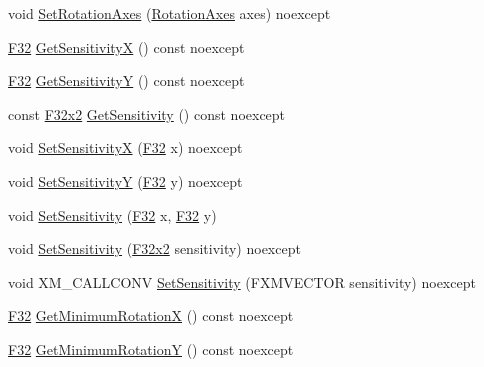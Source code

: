 \begin{DoxyCompactItemize}
void \hyperlink{classmage_1_1script_1_1_mouse_look_script_a82697e11738554a44b4a749227e231ee}{Set\+Rotation\+Axes} (\hyperlink{classmage_1_1script_1_1_mouse_look_script_a662018db64c5dc84a958eb1c6123a829}{Rotation\+Axes} axes) noexcept
\item 
\hyperlink{namespacemage_aa97e833b45f06d60a0a9c4fc22ae02c0}{F32} \hyperlink{classmage_1_1script_1_1_mouse_look_script_a86ee9593f0221bfa259f5ae5dd6edb30}{Get\+SensitivityX} () const noexcept
\item 
\hyperlink{namespacemage_aa97e833b45f06d60a0a9c4fc22ae02c0}{F32} \hyperlink{classmage_1_1script_1_1_mouse_look_script_a39303e2d535ecc610ac4ea2f23825452}{Get\+SensitivityY} () const noexcept
\item 
const \hyperlink{namespacemage_aa87237ad091f5cd7da612b8523fc108f}{F32x2} \hyperlink{classmage_1_1script_1_1_mouse_look_script_aba0ebcfb2085d74ee7d6b388d4b0b239}{Get\+Sensitivity} () const noexcept
\item 
void \hyperlink{classmage_1_1script_1_1_mouse_look_script_a97c2564df1660fb9d07f9a4269a77568}{Set\+SensitivityX} (\hyperlink{namespacemage_aa97e833b45f06d60a0a9c4fc22ae02c0}{F32} x) noexcept
\item 
void \hyperlink{classmage_1_1script_1_1_mouse_look_script_a95376c27d55cf12d557427b68ccbd802}{Set\+SensitivityY} (\hyperlink{namespacemage_aa97e833b45f06d60a0a9c4fc22ae02c0}{F32} y) noexcept
\item 
void \hyperlink{classmage_1_1script_1_1_mouse_look_script_a6116637b42e58b8f40de86ed47b54fe3}{Set\+Sensitivity} (\hyperlink{namespacemage_aa97e833b45f06d60a0a9c4fc22ae02c0}{F32} x, \hyperlink{namespacemage_aa97e833b45f06d60a0a9c4fc22ae02c0}{F32} y)
\item 
void \hyperlink{classmage_1_1script_1_1_mouse_look_script_adf611a4d9240e6cf338b665a2713cd9f}{Set\+Sensitivity} (\hyperlink{namespacemage_aa87237ad091f5cd7da612b8523fc108f}{F32x2} sensitivity) noexcept
\item 
void X\+M\+\_\+\+C\+A\+L\+L\+C\+O\+NV \hyperlink{classmage_1_1script_1_1_mouse_look_script_a784937d1254fe26ee28864d11956cd80}{Set\+Sensitivity} (F\+X\+M\+V\+E\+C\+T\+OR sensitivity) noexcept
\item 
\hyperlink{namespacemage_aa97e833b45f06d60a0a9c4fc22ae02c0}{F32} \hyperlink{classmage_1_1script_1_1_mouse_look_script_ae594a42302f9ccd47e08070759c3ccf7}{Get\+Minimum\+RotationX} () const noexcept
\item 
\hyperlink{namespacemage_aa97e833b45f06d60a0a9c4fc22ae02c0}{F32} \hyperlink{classmage_1_1script_1_1_mouse_look_script_a8faf82867207fb604f7155b8dbadfdb0}{Get\+Minimum\+RotationY} () const noexcept

\end{DoxyCompactItemize}
